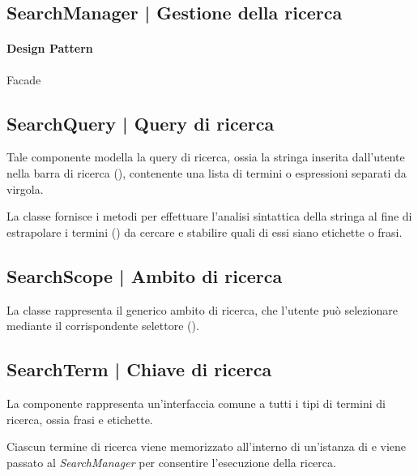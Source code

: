 \documentclass[10pt,a4paper,headinclude,footinclude,hidelinks]{scrreprt} %
\begin{document}
	\subsection[SearchManager]{SearchManager | Gestione della ricerca}
	\label{sec:stage:design:sistema:model.search:search-manager}

	\paragraph{Design Pattern} Facade

	\subsection[SearchQuery]{SearchQuery | Query di ricerca}
	\label{sec:stage:design:sistema:model.search:search-query}
	Tale componente modella la query di ricerca, ossia la stringa inserita dall'utente nella barra di ricerca (\textit{}), contenente una lista di termini o espressioni separati da virgola.

	La classe fornisce i metodi per effettuare l'analisi sintattica della stringa al fine di estrapolare i termini (\textit{}) da cercare e stabilire quali di essi siano etichette o frasi.

	\subsection[SearchScope]{SearchScope | Ambito di ricerca}
	\label{sec:stage:design:sistema:model.search:search-scope}
	La classe rappresenta il generico ambito di ricerca, che l'utente può selezionare mediante il corrispondente selettore (\textit{}).

	\subsection[SearchTerm]{SearchTerm | Chiave di ricerca}
	\label{sec:stage:design:sistema:model.search:search-term}
	La componente rappresenta un'interfaccia comune a tutti i tipi di termini di ricerca, ossia frasi e etichette.

	Ciascun termine di ricerca viene memorizzato all'interno di un'istanza di \textit{} e viene passato al \textit{SearchManager} per consentire l'esecuzione della ricerca.
\end{document}
